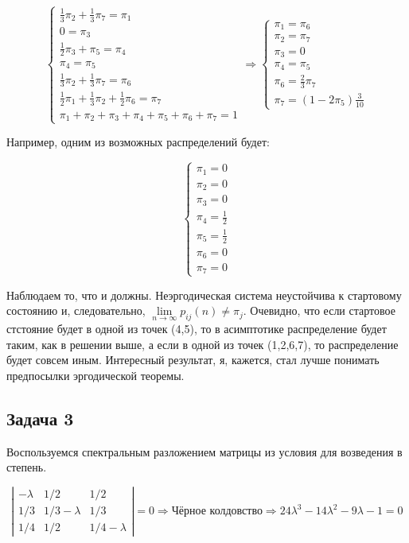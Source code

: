 \documentclass[a4paper,12pt]{article}
\begin{document}
\[ \begin{cases} 
\frac{1}{3}\pi_2 + \frac{1}{3}\pi_7 = \pi_1\\
0 = \pi_3\\
\frac{1}{2}\pi_3 + \pi_5 = \pi_4\\
\pi_4 = \pi_5\\
\frac{1}{3}\pi_2 + \frac{1}{3}\pi_7 = \pi_6\\
\frac{1}{2}\pi_1 + \frac{1}{3}\pi_2 + \frac{1}{2}\pi_6 = \pi_7\\
\pi_1 + \pi_2 + \pi_3 + \pi_4 + \pi_5 + \pi_6 + \pi_7 = 1
 \end{cases} \Rightarrow \begin{cases}
 \pi_1 = \pi_6\\
 \pi_2 = \pi_7\\
 \pi_3 = 0\\
 \pi_4 = \pi_5\\
 \pi_6 = \frac{2}{3}\pi_7\\
 \pi_7 = (1-2\pi_5)\frac{3}{10}
 \end{cases}\]



Например, одним из возможных распределений будет:

\[ \begin{cases}
\pi_1 = 0\\
\pi_2 = 0\\
\pi_3 = 0\\
\pi_4 = \frac{1}{2}\\
\pi_5 = \frac{1}{2}\\
\pi_6 = 0\\
\pi_7 = 0
\end{cases} \]

Наблюдаем то, что и должны. Неэргодическая система неустойчива к стартовому состоянию и, следовательно, $ \lim\limits_{n \to \infty} p_{ij}(n) \neq \pi_{j} $. Очевидно, что если стартовое стстояние будет в одной из точек (4,5), то в асимптотике распределение будет таким, как в решении выше, а если в одной из точек (1,2,6,7), то распределение будет совсем иным. Интересный результат, я, кажется, стал лучше понимать предпосылки эргодической теоремы.

\subsection{Задача 3}

Воспользуемся спектральным разложением матрицы из условия для возведения в степень.

\[
\left|\begin{array}{ccc}{-\lambda} & {1 / 2} & {1 / 2} \\ {1 / 3} & {1 / 3 - \lambda} & {1 / 3} \\ {1 / 4} & {1 / 2} & {1 / 4 - \lambda}\end{array}\right| = 0 \Rightarrow \text{Чёрное колдовство} \Rightarrow 24 \lambda^3 - 14\lambda^2 - 9\lambda - 1 = 0
\]
\end{document}
